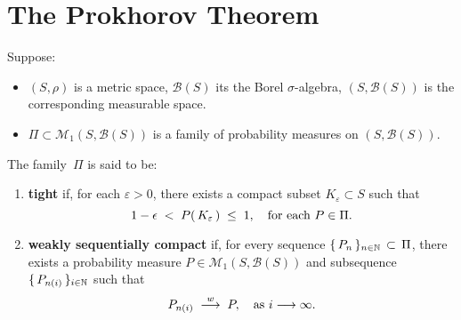 

\section{The Prokhorov Theorem}
\setcounter{theorem}{0}
\setcounter{equation}{0}

\renewcommand{\theenumi}{\roman{enumi}}
\renewcommand{\labelenumi}{\textnormal{(\theenumi)}$\;\;$}

\begin{definition}
\mbox{}\vskip 0.2cm
\noindent
Suppose:
\begin{itemize}
\item	$\left(S,\rho\right)$ is a metric space, $\mathcal{B}(S)$ its the Borel $\sigma$-algebra,
		$\left(S,\mathcal{B}(S)\right)$ is the corresponding measurable space.
\item	$\Pi \subset \mathcal{M}_{1}\!\left(S,\mathcal{B}(S)\right)$
		is a family of probability measures on $\left(S,\mathcal{B}(S)\right)$.
\end{itemize}
The family \,$\Pi$ is said to be:
\begin{enumerate}
\item
	\textbf{tight} if, for each $\varepsilon > 0$,
	there exists a compact subset $K_{\varepsilon} \subset S$ such that
	\begin{equation*}
	1 - \epsilon \; < \; P\!\left(\,K_{\varepsilon}\,\right) \;\leq\; 1,
	\quad\textnormal{for each $P \in \Pi$}.
	\end{equation*}
\item
	\textbf{weakly sequentially compact} if, for every sequence $\{\,P_{n}\,\}_{n\in\mathbb{N}} \,\subset\, \Pi$,
	there exists a probability measure $P \in \mathcal{M}_{1}\!\left(S,\mathcal{B}(S)\right)$
	and subsequence $\{\,P_{n(i)}\,\}_{i\in\mathbb{N}}$ such that
	\begin{equation*}
	P_{n(i)} \; \overset{w}{\longrightarrow} \; P,
	\quad\textnormal{as $i \longrightarrow\infty$}.
	\end{equation*}
\end{enumerate}
\end{definition}


